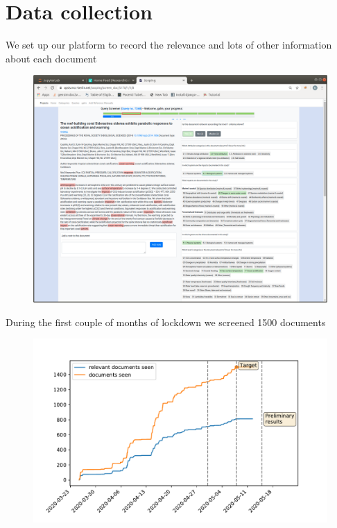 \documentclass[9pt]{beamer}
\begin{document}
\section{Data collection}
\begin{frame}
\tableofcontents[currentsection]
\end{frame}

\begin{frame}{We set up our platform to record the relevance and lots of other information about each document}

\begin{figure}
	\includegraphics[width=\linewidth]{../plots/screening-platform}
\end{figure}

\end{frame}

\begin{frame}{During the first couple of months of lockdown we screened 1500 documents}

\begin{figure}
	\includegraphics[width=\linewidth]{../plots/progress/plan.pdf}
\end{figure}

\end{frame}
\end{document}
